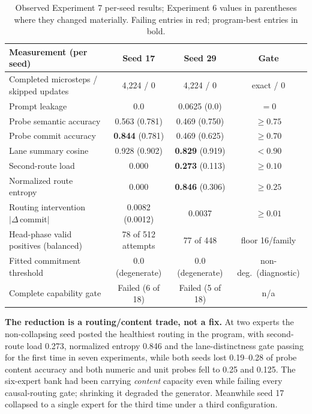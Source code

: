 \documentclass[10pt,a4paper]{article}
\newcommand{\fail}[1]{\textcolor{failred}{#1}}
\begin{document}
\begin{table}[htbp]
\caption{Observed Experiment 7 per-seed results; Experiment 6 values in parentheses
where they changed materially. Failing entries in red; program-best entries
in bold.}
\label{tab:study7}
\centering\small
\begin{tabularx}{\textwidth}{@{}Xccc@{}}
\toprule
\textbf{Measurement (per seed)} & \textbf{Seed 17} & \textbf{Seed 29} & \textbf{Gate} \\
\midrule
Completed microsteps / skipped updates & 4{,}224 / 0 & 4{,}224 / 0 & exact / 0 \\
Prompt leakage & 0.0 & \fail{0.0625} (0.0) & $= 0$ \\
Probe semantic accuracy & \fail{0.563} (0.781) & \fail{0.469} (0.750) & $\ge 0.75$ \\
Probe commit accuracy & \textbf{0.844} (0.781) & \fail{0.469} (0.625) & $\ge 0.70$ \\
Lane summary cosine & \fail{0.928} (0.902) & \textbf{0.829} (0.919) & $< 0.90$ \\
Second-route load & \fail{0.000} & \textbf{0.273} (0.113) & $\ge 0.10$ \\
Normalized route entropy & \fail{0.000} & \textbf{0.846} (0.306) & $\ge 0.25$ \\
Routing intervention $|\Delta\,\mathrm{commit}|$ & \fail{0.0082} (0.0012) & \fail{0.0037} & $\ge 0.01$ \\
Head-phase valid positives (balanced) & 78 of 512 attempts & 77 of 448 & floor 16/family \\
Fitted commitment threshold & \fail{0.0 (degenerate)} & \fail{0.0 (degenerate)} & non-deg.\ (diagnostic) \\
Complete capability gate & \fail{Failed (6 of 18)} & \fail{Failed (5 of 18)} & n/a \\
\bottomrule
\end{tabularx}
\end{table}

\textbf{The reduction is a routing/content trade, not a fix.} At two experts
the non-collapsing seed posted the healthiest routing in the program, with
second-route load 0.273, normalized entropy 0.846 and the lane-distinctness
gate passing for the first time in seven experiments, while both seeds lost
0.19--0.28 of probe content accuracy and both numeric and unit probes fell to
0.25 and 0.125. The six-expert bank had been carrying \emph{content}
capacity even while failing every causal-routing gate; shrinking it degraded
the generator. Meanwhile seed 17 collapsed to a single expert for the third
time under a third configuration.
\end{document}
